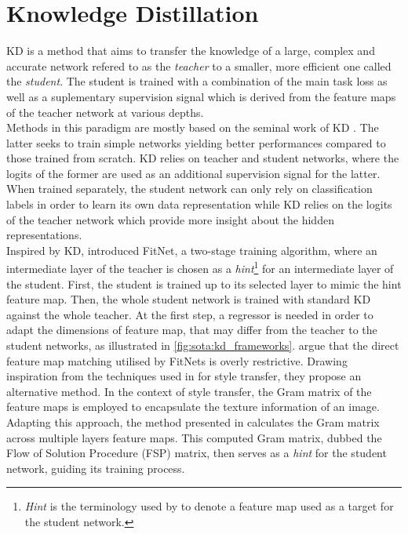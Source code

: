 \section{Knowledge Distillation}

\acf{KD} is a method that aims to transfer the knowledge of a large, complex and
accurate network refered to as the \emph{teacher} to a smaller, more efficient
one called the \emph{student}. The student is trained with a combination of the
main task loss as well as a suplementary supervision signal which is derived
from the feature maps of the teacher network at various depths.\\

Methods in this paradigm are mostly based on the seminal work of \ac{KD}
\cite{DBLP:journals/corr/HintonVD15}. The latter seeks to train simple networks
yielding better performances compared to those trained from scratch. \ac{KD}
relies on teacher and student networks, where the logits of the former are used
as an additional supervision signal for the latter. When trained separately, the
student network can only rely on classification labels in order to learn its own
data representation while \ac{KD} relies on the logits of the teacher network
which provide more insight about the hidden representations.\\

Inspired by \ac{KD}, \cite{DBLP:journals/corr/RomeroBKCGB14} introduced FitNet,
a two-stage training algorithm, where an intermediate layer of the teacher is
chosen as a \emph{hint}\footnote{\emph{Hint} is the terminology used by
\citeauthor{DBLP:journals/corr/RomeroBKCGB14}
\cite{DBLP:journals/corr/RomeroBKCGB14} to denote a feature map used as a target
for the student network.} for an intermediate layer of the student. First, the
student is trained up to its selected layer to mimic the hint feature map. Then,
the whole student network is trained with standard \ac{KD} against the whole
teacher. At the first step, a regressor is needed in order to adapt the
dimensions of feature map, that may differ from the teacher to the student
networks, as illustrated in \cref{fig:sota:kd_frameworks}.
\citeauthor{DBLP:conf/cvpr/YimJBK17} argue that the direct feature map matching
utilised by FitNets is overly restrictive. Drawing inspiration from the
techniques used in \cite{DBLP:journals/corr/GatysEB15a} for style transfer, they
propose an alternative method. In the context of style transfer, the Gram matrix
of the feature maps is employed to encapsulate the texture information of an
image. Adapting this approach, the method presented in
\cite{DBLP:conf/cvpr/YimJBK17} calculates the Gram matrix across multiple layers
feature maps. This computed Gram matrix, dubbed the Flow of Solution Procedure
(FSP) matrix, then serves as a \emph{hint} for the student network, guiding its
training process.\\


